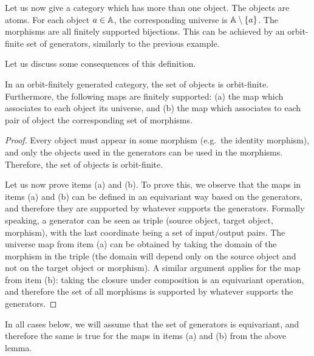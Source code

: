 \begin{myexample} Let us now give a category which has more than one object.
The objects are atoms. For each object $a \in \mathbb A$, the corresponding universe is $\mathbb A \setminus \{a\}$. The morphisms are all finitely supported bijections. This can be achieved by an orbit-finite set of generators, similarly to the previous example.
\end{myexample}

Let us discuss some consequences of this definition. 

\begin{lemma}
    In an orbit-finitely generated category, the set of objects is orbit-finite. Furthermore, the following maps are finitely supported: (a) the map which associates to each object its universe, and (b) the map which associates to each pair of object the corresponding set of morphisms.
\end{lemma}
\begin{proof}
    Every object must appear in some morphism (e.g.~the identity morphism), and only the objects used in the generators can be used in the morphisms. Therefore, the set of objects is orbit-finite. 

    Let us now prove items (a) and (b). To prove this, we observe that the maps in items (a) and (b) can be defined in an equivariant way based on the generators, and therefore they are supported by whatever supports the generators.  Formally speaking, a generator can be seen as triple (source object, target object, morphism), with the last coordinate being a set of input/output pairs. The universe map from item (a) can be obtained by taking the domain of the morphism in the triple (the domain will depend only on the source object and not on the target object or morphism). A similar argument applies for the map from item (b):  taking the closure under composition is an equivariant operation, and therefore the set of all morphisms is supported by whatever supports the generators. 
\end{proof}

In all cases below, we will assume that the set of generators is equivariant, and therefore the same is true for the maps in items (a) and (b) from the above lemma. 


